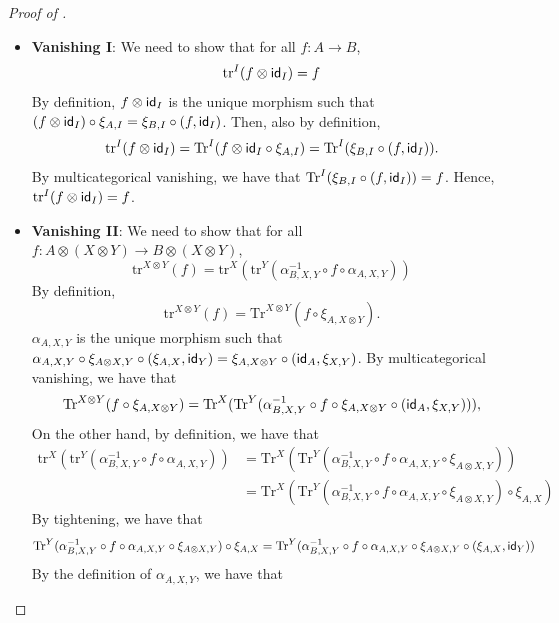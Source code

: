 \begin{proof}[Proof of ]
\begin{itemize}
\[    \]
    By definition, $\text{tr}^{Y}(f \circ (\id_{A} \otimes g)) = \text{tr}^{Y}(f \circ g_{A}) = \text{Tr}^{Y}(f \circ g_{A} \circ \xi_{A,Y}) = \text{Tr}^{Y}(f \circ \xi_{A,X} \circ (\id_{A},g)) = \text{Tr}^{X}(k) = \text{tr}^{X}(g_{B} \circ f)$.
    \item \textbf{Vanishing I}: We need to show that for all $f : A \to B$,
    \[
    \text{tr}^{I}(f \otimes \textsf{id}_{I}) = f
    \]
    By definition, $f \otimes \textsf{id}_{I}$ is the unique morphism such that $(f \otimes \textsf{id}_{I}) \circ \xi_{A,I} = \xi_{B,I} \circ (f, \textsf{id}_{I})$.
    Then, also by definition,
    \[
    \text{tr}^{I}(f \otimes \textsf{id}_{I}) = \text{Tr}^{I}(f \otimes \textsf{id}_{I} \circ \xi_{A,I}) = \text{Tr}^{I}(\xi_{B,I} \circ (f, \textsf{id}_{I})).
    \]
    By multicategorical vanishing, we have that $\text{Tr}^{I}(\xi_{B,I} \circ (f, \textsf{id}_{I})) = f$.
    Hence, $\text{tr}^{I}(f \otimes \textsf{id}_{I}) = f$.
    \item \textbf{Vanishing II}: We need to show that for all $f : A \otimes (X \otimes Y) \to B \otimes (X \otimes Y)$,
    \[
    \text{tr}^{X \otimes Y}(f) = \text{tr}^{X}(\text{tr}^{Y}(\alpha_{B,X,Y}^{-1} \circ f \circ \alpha_{A,X,Y}))
    \]
    By definition, 
    \[
    \text{tr}^{X \otimes Y}(f) = \text{Tr}^{X \otimes Y}(f \circ \xi_{A, X \otimes Y}).
    \]
    $\alpha_{A,X,Y}$ is the unique morphism such that $\alpha_{A,X,Y} \circ \xi_{A \otimes X, Y} \circ (\xi_{A,X}, \textsf{id}_{Y}) = \xi_{A, X \otimes Y} \circ (\textsf{id}_{A}, \xi_{X,Y})$.
    By multicategorical vanishing, we have that
    \[
    \text{Tr}^{X \otimes Y}(f \circ \xi_{A, X \otimes Y}) = \text{Tr}^{X}(\text{Tr}^{Y}(\alpha_{B,X,Y}^{-1} \circ f \circ \xi_{A, X \otimes Y} \circ (\textsf{id}_{A}, \xi_{X,Y}))),
    \]
    On the other hand, by definition, we have that
    \begin{align*}
    \text{tr}^{X}(\text{tr}^{Y}(\alpha_{B,X,Y}^{-1} \circ f \circ \alpha_{A,X,Y})) &= \text{Tr}^{X}(\text{Tr}^{Y}(\alpha_{B,X,Y}^{-1} \circ f \circ \alpha_{A,X,Y} \circ \xi_{A \otimes X, Y}))\\
    &= \text{Tr}^{X}(\text{Tr}^{Y}(\alpha_{B,X,Y}^{-1} \circ f \circ \alpha_{A,X,Y} \circ \xi_{A \otimes X, Y}) \circ \xi_{A,X})
    \end{align*}
    By tightening, we have that
    \[
    \text{Tr}^{Y}(\alpha_{B,X,Y}^{-1} \circ f \circ \alpha_{A,X,Y} \circ \xi_{A \otimes X, Y}) \circ \xi_{A,X} = \text{Tr}^{Y}(\alpha_{B,X,Y}^{-1} \circ f \circ \alpha_{A,X,Y} \circ \xi_{A \otimes X, Y} \circ (\xi_{A,X}, \textsf{id}_{Y}))
    \]
    By the definition of $\alpha_{A,X,Y}$, we have that
    \[
\]
\end{itemize}
\end{proof}
